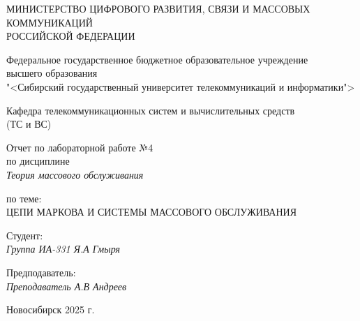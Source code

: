 \thispagestyle{empty}

\begin{center}
    МИНИСТЕРСТВО ЦИФРОВОГО РАЗВИТИЯ, СВЯЗИ И МАССОВЫХ КОММУНИКАЦИЙ \\ РОССИЙСКОЙ ФЕДЕРАЦИИ

    \vspace{20pt}

    Федеральное государственное бюджетное образовательное учреждение  \\  высшего образования \\
    "<Сибирский государственный университет телекоммуникаций и информатики"> \\

    \vspace{20pt}

    Кафедра телекоммуникационных систем и вычислительных средств \\  (ТС и ВС)
\end{center}

\vfill

\begin{center}
    Отчет по лабораторной работе №4 \\  
    по дисциплине \\
    \textit{Теория массового обслуживания}

    \vspace{20pt} 
    по теме: \\
    \uppercase{Цепи Маркова и системы массового обслуживания}
\end{center}

\vfill

    \noindent Студент: \\
    \textit{Группа ИА-331 \hfill Я.А Гмыря}

    \vspace{20pt}

    \noindent Предподаватель: \\
    \textit{Преподаватель \hfill А.В Андреев}

\vfill

\begin{center}
    Новосибирск 2025 г.
\end{center}